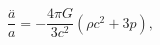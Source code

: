 \begin{equation}
\frac{\stackrel{..}{a}}{a}=-\frac{4\pi G}{3c^2}(\rho c^2+3p),
\label{cde1}
\end{equation}


